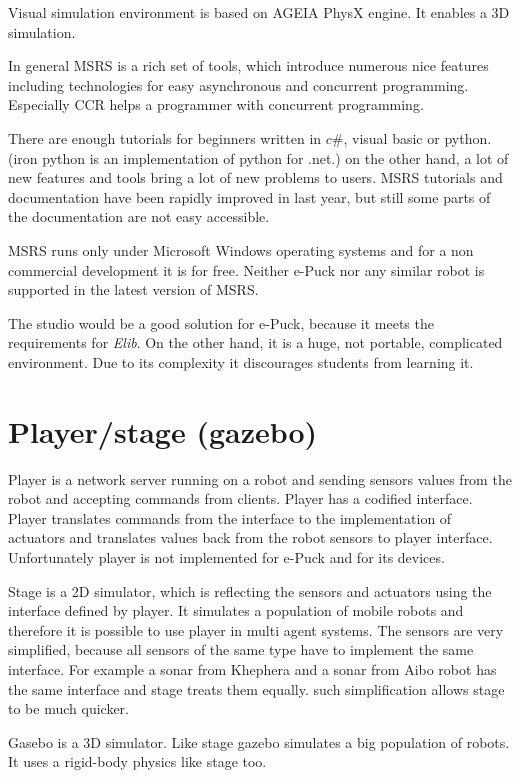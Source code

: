   Visual simulation environment is based on AGEIA PhysX engine. It enables a 3D simulation.
  
  In general MSRS is a rich set of tools, which introduce numerous nice features including
  technologies for easy asynchronous and concurrent programming. Especially CCR helps
  a programmer with concurrent programming. 
  
  There are enough tutorials for beginners written
  in $c\#$, visual basic or python. (iron python is an implementation of python for .net.)
  on the other hand, a lot of new features and tools bring a lot of new problems to users.
  MSRS tutorials and documentation have been rapidly improved in last year, but still some parts
  of the documentation are not easy accessible.
  
  MSRS runs only under Microsoft Windows operating systems and for a non commercial development
  it is for free. Neither e-Puck nor any similar robot is supported in the latest version of MSRS.
  
  The studio would be a good solution for e-Puck, because it meets the requirements for {\it Elib}.
  On the other hand, it is a huge, not portable, complicated environment.
  Due to its complexity it discourages students from learning it.
\section{Player/stage (gazebo) }
  Player\cite{player} is a network server running on a robot and sending sensors values from the robot and
  accepting commands from clients. Player\cite{player} has a codified interface. Player\cite{player} translates
  commands from the interface to the implementation of actuators and translates values back from the robot sensors 
  to player\cite{player} interface. Unfortunately player\cite{player} is not implemented for e-Puck
  and for its devices.
  
  Stage is a 2D simulator, which is reflecting the sensors and actuators using the interface defined by player.
  It simulates a population of mobile robots and therefore it is possible to use player 
  in multi agent systems.
  The sensors are very simplified, because all sensors of the same type 
  have to implement the same interface. For example a sonar from Khephera and a sonar from Aibo robot
  has the same interface and stage treats them equally. 
  such simplification allows stage to be much quicker.
  
  Gasebo\cite{player} is a 3D simulator. Like stage gazebo simulates a big population of robots.
  It uses a rigid-body physics like stage too.
  
